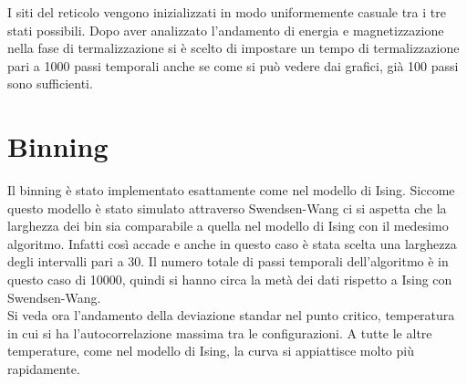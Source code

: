 I siti del reticolo vengono inizializzati in modo uniformemente casuale tra i tre stati possibili.
Dopo aver analizzato l'andamento di energia e magnetizzazione nella fase di termalizzazione si è scelto di impostare un tempo di termalizzazione pari a 1000 passi temporali anche se come si può vedere dai grafici, già 100 passi sono sufficienti.

\section{Binning}
Il binning è stato implementato esattamente come nel modello di Ising. Siccome questo modello è stato simulato attraverso Swendsen-Wang ci si aspetta che la larghezza dei bin sia comparabile a quella nel modello di Ising con il medesimo algoritmo. Infatti così accade e anche in questo caso è stata scelta una larghezza degli intervalli pari a 30. Il numero totale di passi temporali dell'algoritmo è in questo caso di 10000, quindi si hanno circa la metà dei dati rispetto a Ising con Swendsen-Wang.\\
Si veda ora l'andamento della deviazione standar nel punto critico, temperatura in cui si ha l'autocorrelazione massima tra le configurazioni. A tutte le altre temperature, come nel modello di Ising, la curva si appiattisce molto più rapidamente.
